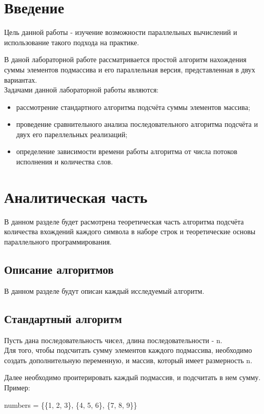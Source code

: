 \documentclass[12pt,a4paper]{article}
\numberwithin{equation}{section}
\begin{document}
\section*{\Huge Введение}
Цель данной работы - изучение возможности параллельных вычислений и использование такого подхода на практике.

В даной лабораторной работе рассматривается простой алгоритм нахождения суммы элементов подмассива и его параллельная версия, представленная в двух вариантах.\\
Задачами данной лабораторной работы являются:\\
\begin{itemize}
	\item рассмотрение стандартного алгоритма подсчёта суммы элементов массива;
	\item проведение сравнительного анализа последовательного алгоритма подсчёта и двух его пареллельных реализаций;
	\item определение зависимости времени работы алгоритма от числа потоков исполнения и количества слов.
\end{itemize}

\clearpage

\section{Аналитическая часть}
В данном разделе будет расмотрена теоретическая часть алгоритма подсчёта количества вхождений каждого символа в наборе строк и теоретические основы параллельного программирования.

\subsection{Описание алгоритмов}
\qquad В данном разделе будут описан каждый исследуемый алгоритм.

\subsection{Стандартный алгоритм}
Пусть дана последовательность чисел, длина последовательности - n.\\
Для того, чтобы подсчитать сумму элементов каждого подмассива, необходимо создать дополнительную переменную, и массив, который имеет размерность n.

Далее необходимо проитерировать каждый подмассив, и подсчитать в нем сумму.\\
Пример:
\begin{center}
	numbers = \{\{1, 2, 3\}, \{4, 5, 6\}, \{7, 8, 9\}\}
\end{center}
\end{document}
